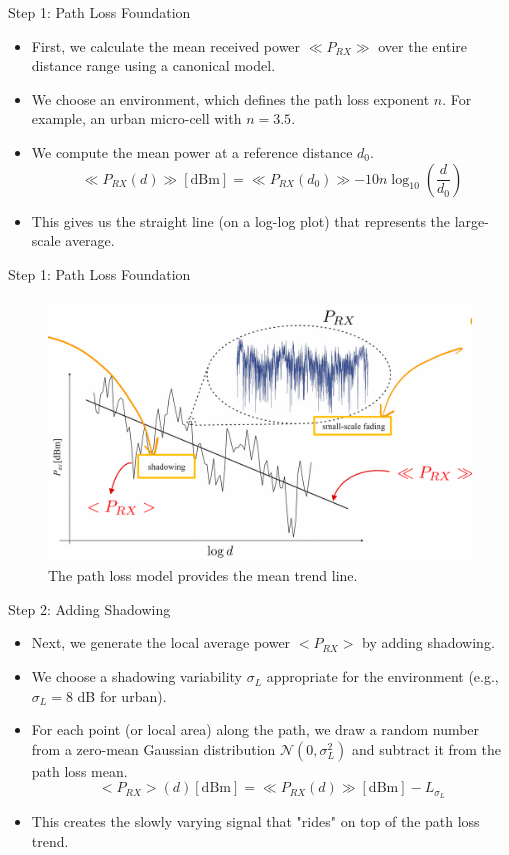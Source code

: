 \documentclass{beamer}
\begin{document}
	\begin{frame}{Step 1: Path Loss Foundation}
		\begin{itemize}
			\item First, we calculate the mean received power $\ll P_{RX} \gg$ over the entire distance range using a canonical model.
			\item We choose an environment, which defines the path loss exponent $n$. For example, an urban micro-cell with $n=3.5$.
			\item We compute the mean power at a reference distance $d_0$.
			\[ \ll P_{RX}(d)\gg[\text{dBm}] = \ll P_{RX}(d_{0})\gg - 10n \log_{10}\left(\frac{d}{d_0}\right) \]
			\item This gives us the straight line (on a log-log plot) that represents the large-scale average.
		\end{itemize}
	\end{frame}
	
	\begin{frame}{Step 1: Path Loss Foundation}
		\begin{figure}
			\centering
			\includegraphics[width=0.7\linewidth]{"pictures/power-components.png"}
			\caption{The path loss model provides the mean trend line.}
		\end{figure}
	\end{frame}
	
	\begin{frame}{Step 2: Adding Shadowing}
		\begin{itemize}
			\item Next, we generate the local average power $<P_{RX}>$ by adding shadowing.
			\item We choose a shadowing variability $\sigma_L$ appropriate for the environment (e.g., $\sigma_L = 8$ dB for urban).
			\item For each point (or local area) along the path, we draw a random number from a zero-mean Gaussian distribution $\mathcal{N}(0, \sigma_L^2)$ and subtract it from the path loss mean.
			\[ <P_{RX}>(d)[\text{dBm}] = \ll P_{RX}(d)\gg[\text{dBm}] - L_{\sigma_L} \]
			\item This creates the slowly varying signal that "rides" on top of the path loss trend.
		\end{itemize}
	\end{frame}
	
\end{document}
